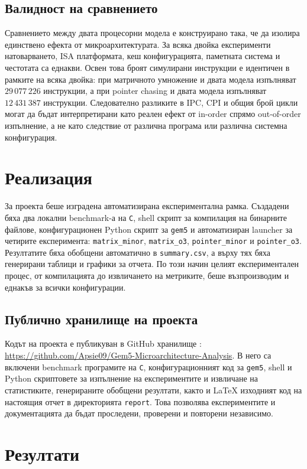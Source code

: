\documentclass[12pt,a4paper]{article}
\begin{document}
\subsection{Валидност на сравнението}
Сравнението между двата процесорни модела е конструирано така, че да изолира единствено ефекта от микроархитектурата. За всяка двойка експерименти натоварването, ISA платформата, кеш конфигурацията, паметната система и честотата са еднакви. Освен това броят симулирани инструкции е идентичен в рамките на всяка двойка: при матричното умножение и двата модела изпълняват \(29\,077\,226\) инструкции, а при pointer chasing и двата модела изпълняват \(12\,431\,387\) инструкции. Следователно разликите в IPC, CPI и общия брой цикли могат да бъдат интерпретирани като реален ефект от in-order спрямо out-of-order изпълнение, а не като следствие от различна програма или различна системна конфигурация.

\section{Реализация}
За проекта беше изградена автоматизирана експериментална рамка. Създадени бяха два локални benchmark-а на \texttt{C}, shell скрипт за компилация на бинарните файлове, конфигурационен Python скрипт за \texttt{gem5} и автоматизиран launcher за четирите експеримента: \texttt{matrix\_minor}, \texttt{matrix\_o3}, \texttt{pointer\_minor} и \texttt{pointer\_o3}. Резултатите бяха обобщени автоматично в \texttt{summary.csv}, а върху тях бяха генерирани таблици и графики за отчета. По този начин целият експериментален процес, от компилацията до извличането на метриките, беше възпроизводим и еднакъв за всички конфигурации.

\subsection{Публично хранилище на проекта}
Кодът на проекта е публикуван в GitHub хранилище \cite{projectrepo}: \url{https://github.com/Apsie09/Gem5-Microarchitecture-Analysis}. В него са включени benchmark програмите на \texttt{C}, конфигурационният код за \texttt{gem5}, shell и Python скриптовете за изпълнение на експериментите и извличане на статистиките, генерираните обобщени резултати, както и \LaTeX{} изходният код на настоящия отчет в директорията \texttt{report}. Това позволява експериментите и документацията да бъдат проследени, проверени и повторени независимо.

\section{Резултати}
\end{document}
